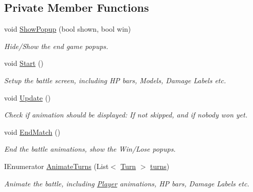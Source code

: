 \subsection*{Private Member Functions}
\begin{DoxyCompactItemize}
\item 
\mbox{\label{class_gameplay_a26e8c55ca4dbbfb1898a3a7bb06d679d}} 
void \mbox{\hyperlink{class_gameplay_a26e8c55ca4dbbfb1898a3a7bb06d679d}{Show\+Popup}} (bool shown, bool win)
\begin{DoxyCompactList}\small\item\em Hide/\+Show the end game popups. \end{DoxyCompactList}\item 
\mbox{\label{class_gameplay_a3262248fce4aeecf5de2486bb3305de3}} 
void \mbox{\hyperlink{class_gameplay_a3262248fce4aeecf5de2486bb3305de3}{Start}} ()
\begin{DoxyCompactList}\small\item\em Setup the battle screen, including HP bars, Models, Damage Labels etc. \end{DoxyCompactList}\item 
\mbox{\label{class_gameplay_a0b4601bd58b54a27d9c4d3c6c9b72d8c}} 
void \mbox{\hyperlink{class_gameplay_a0b4601bd58b54a27d9c4d3c6c9b72d8c}{Update}} ()
\begin{DoxyCompactList}\small\item\em Check if animation should be displayed\+: If not skipped, and if nobody won yet. \end{DoxyCompactList}\item 
\mbox{\label{class_gameplay_ab30c33d44acef3478ae5b601c14a4346}} 
void \mbox{\hyperlink{class_gameplay_ab30c33d44acef3478ae5b601c14a4346}{End\+Match}} ()
\begin{DoxyCompactList}\small\item\em End the battle animations, show the Win/\+Lose popups. \end{DoxyCompactList}\item 
\mbox{\label{class_gameplay_a0d0ef2766c769e58dbd93b3467a40d0b}} 
I\+Enumerator \mbox{\hyperlink{class_gameplay_a0d0ef2766c769e58dbd93b3467a40d0b}{Animate\+Turns}} (List$<$ \mbox{\hyperlink{class_turn}{Turn}} $>$ \mbox{\hyperlink{class_gameplay_a835615e1b6b33c0340b1a6a00aff92ef}{turns}})
\begin{DoxyCompactList}\small\item\em Animate the battle, including \mbox{\hyperlink{class_player}{Player}} animations, HP bars, Damage Labels etc. \end{DoxyCompactList}\end{DoxyCompactItemize}
